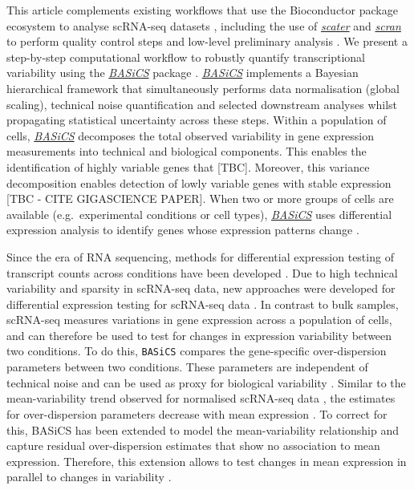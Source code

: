 \documentclass[9pt,a4paper,]{extarticle}
\begin{document}
This article complements existing workflows that use the Bioconductor package
ecosystem to analyse scRNA-seq datasets \citep{Lun2016, Kim2019}, including the use
of \emph{\href{https://bioconductor.org/packages/3.11/scater}{scater}} and \emph{\href{https://bioconductor.org/packages/3.11/scran}{scran}} to perform quality control
steps and low-level preliminary analysis \citep{McCarthy2017, Lun2016}.
We present a step-by-step computational workflow to robustly quantify
transcriptional variability using the \emph{\href{https://bioconductor.org/packages/3.11/BASiCS}{BASiCS}} package
\citep{Vallejos2015, Vallejos2016, Eling2017}.
\emph{\href{https://bioconductor.org/packages/3.11/BASiCS}{BASiCS}} implements a Bayesian hierarchical framework that
simultaneously performs data normalisation (global scaling), technical noise quantification and selected downstream analyses whilst propagating
statistical uncertainty across these steps.
Within a population of cells, \emph{\href{https://bioconductor.org/packages/3.11/BASiCS}{BASiCS}} decomposes the total
observed variability in gene expression measurements into technical and
biological components. This enables the identification of highly variable genes
that {[}TBC{]}. Moreover, this variance decomposition enables detection of lowly
variable genes with stable expression {[}TBC - CITE GIGASCIENCE PAPER{]}. When two
or more groups of cells are available (e.g.~experimental conditions or
cell types), \emph{\href{https://bioconductor.org/packages/3.11/BASiCS}{BASiCS}} uses differential expression analysis to identify genes whose expression patterns change \citep{Vallejos2016}.

Since the era of RNA sequencing, methods for differential expression testing
of transcript counts across conditions have been developed
\citep{Anders2010, Robinson2009}.
Due to high technical variability and sparsity in scRNA-seq data, new
approaches were developed for differential expression testing
for scRNA-seq data \citep{Katayama2013, Kharchenko2014, Delmans2016}.
In contrast to bulk samples, scRNA-seq measures variations in gene expression
across a population of cells, and can therefore be used to test for changes in
expression variability between two conditions.
To do this, \texttt{BASiCS} compares the gene-specific over-dispersion parameters
between two conditions. These parameters are independent of technical noise
and can be used as proxy for biological variability \citep{Vallejos2016}.
Similar to the mean-variability trend observed for normalised scRNA-seq data
\citep{Brennecke2013}, the estimates for over-dispersion parameters decrease with
mean expression \citep{Vallejos2016}.
To correct for this, BASiCS has been extended to model the mean-variability
relationship and capture residual over-dispersion estimates that show no
association to mean expression.
Therefore, this extension allows to test changes in mean expression in parallel
to changes in variability \citep{Eling2018}.
\end{document}

